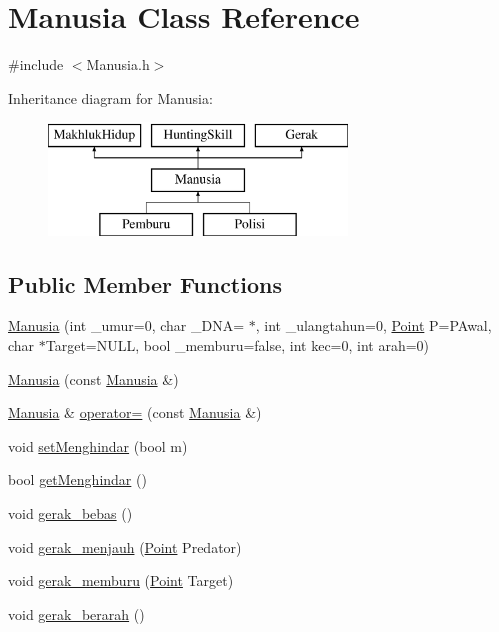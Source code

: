 \hypertarget{class_manusia}{}\section{Manusia Class Reference}
\label{class_manusia}


{\ttfamily \#include $<$Manusia.\+h$>$}

Inheritance diagram for Manusia\+:\begin{figure}[H]
\begin{center}
\leavevmode
\includegraphics[height=3.000000cm]{class_manusia}
\end{center}
\end{figure}
\subsection*{Public Member Functions}
\begin{DoxyCompactItemize}
\item 
\hyperlink{class_manusia_a0fb22ce7d583e644cdaf1d426a2fca4f}{Manusia} (int \+\_\+umur=0, char \+\_\+\+D\+NA= \textquotesingle{}$\ast$\textquotesingle{}, int \+\_\+ulangtahun=0, \hyperlink{class_point}{Point} P=P\+Awal, char $\ast$Target=N\+U\+LL, bool \+\_\+memburu=false, int kec=0, int arah=0)
\item 
\hyperlink{class_manusia_ad575964df3ab12cae6e55c6f498e5739}{Manusia} (const \hyperlink{class_manusia}{Manusia} \&)
\item 
\hyperlink{class_manusia}{Manusia} \& \hyperlink{class_manusia_a5e450b3dde01ce84733c678346eb0caf}{operator=} (const \hyperlink{class_manusia}{Manusia} \&)
\item 
void \hyperlink{class_manusia_a0ad58fdb68abbcebaf7714d071e7e8d3}{set\+Menghindar} (bool m)
\item 
bool \hyperlink{class_manusia_a5606183ee0e8ad0c93a65a2cca6529a6}{get\+Menghindar} ()
\item 
void \hyperlink{class_manusia_a7f67dbd8c2c0bc8ce51d384f9c17746a}{gerak\+\_\+bebas} ()
\item 
void \hyperlink{class_manusia_aa4e3ef878fa2f00b5ca777d0386ae4c8}{gerak\+\_\+menjauh} (\hyperlink{class_point}{Point} Predator)
\item 
void \hyperlink{class_manusia_a090fe1eaf987dce764e219f06d922197}{gerak\+\_\+memburu} (\hyperlink{class_point}{Point} Target)
\item 
void \hyperlink{class_manusia_a636a0198adb7029b5c00ccee59242a9d}{gerak\+\_\+berarah} ()
\end{DoxyCompactItemize}


